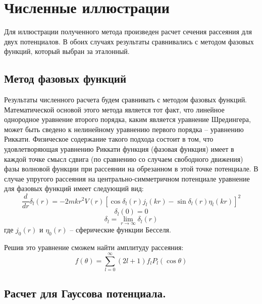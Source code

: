 \documentclass[a4paper,12pt]{article}
\begin{document}
\newline
\section{Численные иллюстрации}
Для иллюстрации полученного метода произведен расчет сечения рассеяния для двух потенциалов. В обоих случаях результаты сравнивались с методом фазовых функций, который выбран за эталонный.

\newline
  \subsection{Метод фазовых функций}
  Результаты численного расчета будем сравнивать с методом фазовых функций. Математической основой этого метода является тот факт, что линейное однородное уравнение второго порядка, каким является уравнение Шредингера, может быть сведено к нелинейному уравнению первого порядка -- уравнению Риккати. Физическое содержание такого подхода состоит в том, что удовлетворяющая уравнению Риккати функция (фазовая функция) имеет в каждой точке смысл сдвига (по сравнению со случаем свободного движения) фазы волновой функции при рассеянии на обрезанном в этой точке потенциале.\cite{babik} В случае упругого рассеяния на центрально-симметричном потенциале уравнение для фазовых функций имеет следующий вид:
  \[
    \frac{d}{d r}\delta_l(r) = - 2mkr^2V(r)[\cos\delta_l(r) j_l(kr) - \sin \delta_l(r)\eta_l(kr)]^{2}
  \]\[
    \delta_l(0) = 0
  \]\[
    \delta_l = \lim_{r \to \infty} \delta_l(r)
  \]
где $j_0(r)$ и $\eta_0(r)$ -- сферические функции Бесселя.

  Решив это уравнение сможем найти амплитуду рассеяния:
  \[
  f(\theta) = \sum\limits_{l=0}^\infty (2l+1) f_l P_l(\cos\theta)
  \]
  
  
\newline
	\subsection{Расчет для Гауссова потенциала.}
	
\end{document}
